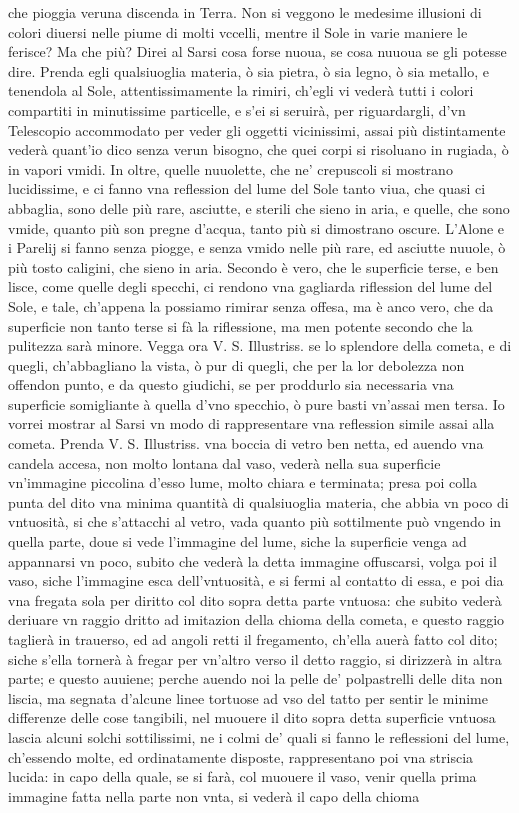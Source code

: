 \documentclass[11pt,twoside,openany]{book}
\begin{document}
che pioggia veruna discenda in Terra. Non si veggono le medesime illusioni di colori diuersi nelle piume di molti vccelli, mentre il Sole in varie maniere le ferisce? Ma che più? Direi al Sarsi cosa forse nuoua, se cosa nuuoua se gli potesse dire. Prenda egli qualsiuoglia materia, ò sia pietra, ò sia legno, ò sia metallo, e tenendola al Sole, attentissimamente la rimiri, ch'egli vi vederà tutti i colori compartiti in minutissime particelle, e s'ei si seruirà, per riguardargli, d'vn Telescopio accommodato per veder gli oggetti vicinissimi, assai più distintamente vederà quant'io dico senza verun bisogno, che quei corpi si risoluano in rugiada, ò in vapori vmidi. In oltre, quelle nuuolette, che ne' crepuscoli si mostrano lucidissime, e ci fanno vna reflession del lume del Sole tanto viua, che quasi ci abbaglia, sono delle più rare, asciutte, e sterili che sieno in aria, e quelle, che sono vmide, quanto più son pregne d'acqua, tanto più si dimostrano oscure. L'Alone e i Parelij si fanno senza piogge, e senza vmido nelle più rare, ed asciutte nuuole, ò più tosto caligini, che sieno in aria. Secondo è vero, che le superficie terse, e ben lisce, come quelle degli specchi, ci rendono vna gagliarda riflession del lume del Sole, e tale, ch'appena la possiamo rimirar senza offesa, ma è anco vero, che da superficie non tanto terse si fà la riflessione, ma men potente secondo che la pulitezza sarà minore. Vegga ora V. S. Illustriss. se lo splendore della cometa, e di quegli, ch'abbagliano la vista, ò pur di quegli, che per la lor debolezza non offendon punto, e da questo giudichi, se per proddurlo sia necessaria vna superficie somigliante à quella d'vno specchio, ò pure basti vn'assai men tersa. Io vorrei mostrar al Sarsi vn modo di rappresentare vna reflession simile assai alla cometa. Prenda V. S. Illustriss. vna boccia di vetro ben netta, ed auendo vna candela accesa, non molto lontana dal vaso, vederà nella sua superficie vn'immagine piccolina d'esso lume, molto chiara e terminata; presa poi colla punta del dito vna minima quantità di qualsiuoglia materia, che abbia vn poco di vntuosità, si che s'attacchi al vetro, vada quanto più sottilmente può vngendo in quella parte, doue si vede l'immagine del lume, siche la superficie venga ad appannarsi vn poco, subito che vederà la detta immagine offuscarsi, volga poi il vaso, siche l'immagine esca dell'vntuosità, e si fermi al contatto di essa, e poi dia vna fregata sola per diritto col dito sopra detta parte vntuosa: che subito vederà deriuare vn raggio dritto ad imitazion della chioma della cometa, e questo raggio taglierà in trauerso, ed ad angoli retti il fregamento, ch'ella auerà fatto col dito; siche s'ella tornerà à fregar per vn'altro verso il detto raggio, si dirizzerà in altra parte; e questo auuiene; perche auendo noi la pelle de' polpastrelli delle dita non liscia, ma segnata d'alcune linee tortuose ad vso del tatto per sentir le minime differenze delle cose tangibili, nel muouere il dito sopra detta superficie vntuosa lascia alcuni solchi sottilissimi, ne i colmi de' quali si fanno le reflessioni del lume, ch'essendo molte, ed ordinatamente disposte, rappresentano poi vna striscia lucida: in capo della quale, se si farà, col muouere il vaso, venir quella prima immagine fatta nella parte non vnta, si vederà il capo della chioma 
\end{document}
